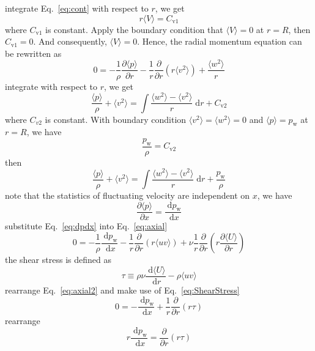 \documentclass{article}
\newcommand{\dd}{\; \mathrm{d}}
\newcommand{\enangle}[1]{\langle {#1} \rangle}
\newcommand{\parpar}[2]{\frac{\partial {#1}}{\partial {#2}}}
\begin{document}
integrate Eq.~\eqref{eq:cont} with respect to $r$, we get
\begin{equation}
	r\enangle{V} = C_{\text{v1}}
\end{equation}
where $C_{\text{v1}}$ is constant. Apply the boundary condition that $\enangle{V} = 0$ at $r = R$, then $C_{\text{v1}} = 0$. And consequently, $\enangle{V} = 0$. Hence, the radial momentum equation can be rewritten as
\begin{equation}
	0 = -\frac{1}{\rho}\parpar{\enangle{p}}{r} - \frac{1}{r}\parpar{}{r}(r\enangle{v^2}) + \frac{\enangle{w^2}}{r}
\end{equation}
integrate with respect to $r$, we get
\begin{equation}
	\frac{\enangle{p}}{\rho} + \enangle{v^2} = \int\frac{\enangle{w^2}-\enangle{v^2}}{r}\dd r + C_{\text{v2}}
\end{equation}
where $C_{v2}$ is constant. With boundary condition $\enangle{v^2}=\enangle{w^2}=0$ and $\enangle{p}=p_{\text{w}}$ at $r=R$, we have
\begin{equation}
	\frac{p_{\text{w}}}{\rho} = C_{\text{v2}}
\end{equation}
then
\begin{equation}
	\frac{\enangle{p}}{\rho} + \enangle{v^2} = \int\frac{\enangle{w^2}-\enangle{v^2}}{r}\dd r + \frac{p_{\text{w}}}{\rho}
\end{equation}
note that the statistics of fluctuating velocity are independent on $x$, we have
\begin{equation} \label{eq:dpdx}
	\parpar{\enangle{p}}{x} = \frac{\dd p_{\text{w}}}{\dd x}
\end{equation}
substitute Eq.~\eqref{eq:dpdx} into Eq.~\eqref{eq:axial}
\begin{equation} \label{eq:axial2}
	0 = -\frac{1}{\rho}\frac{\dd p_{\text{w}}}{\dd x} - \frac{1}{r}\parpar{}{r}(r\enangle{uv}) + \nu\frac{1}{r}\parpar{}{r}\left( r\parpar{\enangle{U}}{r} \right)
\end{equation}
the shear stress is defined as
\begin{equation} \label{eq:ShearStress}
	\tau \equiv \rho\nu\frac{\dd \enangle{U}}{\dd r} - \rho\enangle{uv}
\end{equation}
rearrange Eq.~\eqref{eq:axial2} and make use of Eq.~\eqref{eq:ShearStress}
\begin{equation}
	0 = -\frac{\dd p_{\text{w}}}{\dd x} + \frac{1}{r}\parpar{}{r} (r \tau)
\end{equation}
rearrange
\begin{equation} \label{eq:tau}
	r \frac{\dd p_{\text{w}}}{\dd x} = \parpar{}{r} (r \tau)
\end{equation}
\end{document}
